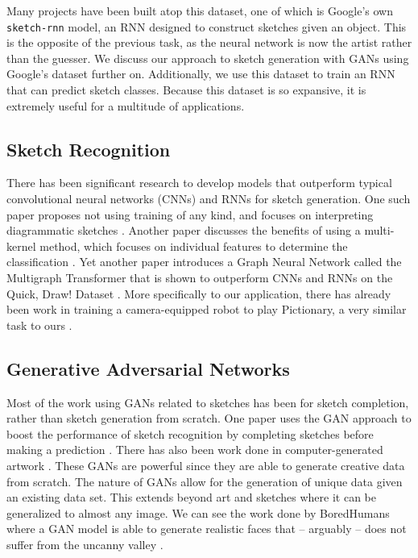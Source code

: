 \documentclass[10pt,twocolumn,letterpaper]{article}
\def\code#1{\texttt{#1}}
\begin{document}
Many projects have been built atop this dataset, one of which is Google’s own \code{sketch-rnn} model, an RNN designed to construct sketches given an object\cite{sketch-rnn}. This is the opposite of the previous task, as the neural network is now the artist rather than the guesser. We discuss our approach to sketch generation with GANs using Google’s dataset further on. Additionally, we use this dataset to train an RNN that can predict sketch classes. Because this dataset is so expansive, it is extremely useful for a multitude of applications.

\subsection{Sketch Recognition}

There has been significant research to develop models that outperform typical convolutional neural networks (CNNs) and RNNs for sketch generation. One such paper proposes not using training of any kind, and focuses on interpreting diagrammatic sketches \cite{sketchRead}. Another paper discusses the benefits of using a multi-kernel method, which focuses on individual features to determine the classification \cite{LI20151}. Yet another paper introduces a Graph Neural Network called the Multigraph Transformer that is shown to outperform CNNs and RNNs on the Quick, Draw! Dataset \cite{9397867}. More specifically to our application, there has already been work in training a camera-equipped robot to play Pictionary, a very similar task to ours \cite{sarvadevabhatla2016enabling}.

\subsection{Generative Adversarial Networks}

Most of the work using GANs related to sketches has been for sketch completion, rather than sketch generation from scratch. One paper uses the GAN approach to boost the performance of sketch recognition by completing sketches before making a prediction \cite{liu2019sketchgan}. There has also been work done in computer-generated artwork \cite{mediumArticle}. These GANs are powerful since they are able to generate creative data from scratch. The nature of GANs allow for the generation of unique data given an existing data set. This extends beyond art and sketches where it can be generalized to almost any image. We can see the work done by BoredHumans where a GAN model is able to generate realistic faces that – arguably – does not suffer from the uncanny valley \cite{boredHumans}. 
\end{document}
